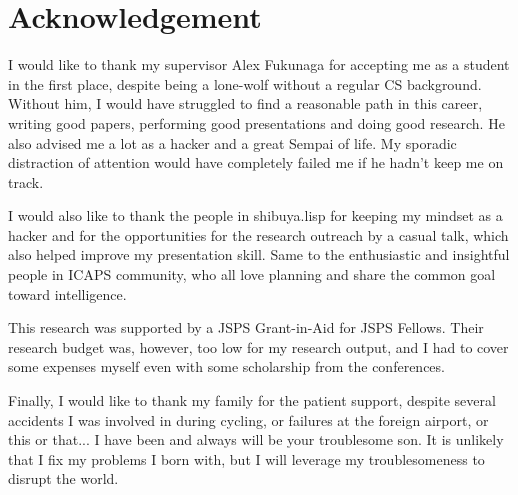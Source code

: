 
\chapter{Acknowledgement}

I would like to thank my supervisor Alex Fukunaga for accepting me as a
student in the first place, despite being a lone-wolf without a regular CS
background. Without him, I would have struggled to find a reasonable
path in this career, writing good papers, performing good presentations and doing good research.
He also advised me a lot as a hacker and a great Sempai of life.
My sporadic distraction of attention would have completely failed me
if he hadn't keep me on track.

I would also like to thank the people in shibuya.lisp for keeping my
mindset as a hacker and for the opportunities for the research outreach by
a casual talk, which also helped improve my presentation skill.
Same to the enthusiastic and insightful people in ICAPS community,
who all love planning and share the common goal toward intelligence.

This research was supported by a JSPS Grant-in-Aid for JSPS
Fellows. Their research budget was, however, too low for my research
output, and I had to cover some expenses myself even with some
scholarship from the conferences.

Finally, I would like to thank my family for the patient support,
despite several accidents I was involved in during cycling, or failures
at the foreign airport, or this or that...  I have been and always will
be your troublesome son.  It is unlikely that I fix my problems I born
with, but I will leverage my troublesomeness to disrupt the world.

